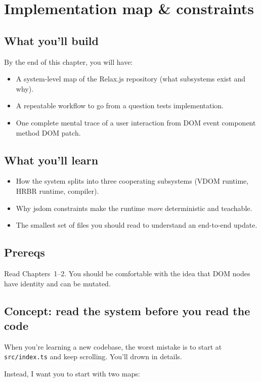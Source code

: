 \chapter{Implementation map \& constraints}

\section{What you'll build}
By the end of this chapter, you will have:

\begin{itemize}
  \item A system-level map of the Relax.js repository (what subsystems exist and why).
  \item A repeatable workflow to go from a question \textrightarrow tests \textrightarrow implementation.
  \item One complete mental trace of a user interaction from DOM event \textrightarrow component method \textrightarrow DOM patch.
\end{itemize}

\section{What you'll learn}
\begin{itemize}
  \item How the system splits into three cooperating subsystems (VDOM runtime, HRBR runtime, compiler).
  \item Why jsdom constraints make the runtime \emph{more} deterministic and teachable.
  \item The smallest set of files you should read to understand an end-to-end update.
\end{itemize}

\section{Prereqs}
Read Chapters~1--2.
You should be comfortable with the idea that DOM nodes have identity and can be mutated.

\section{Concept: read the system before you read the code}
When you're learning a new codebase, the worst mistake is to start at \texttt{src/index.ts} and keep scrolling.
You'll drown in details.

Instead, I want you to start with two maps:

